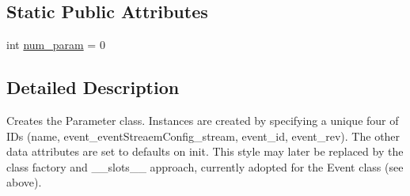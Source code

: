 \subsection*{Static Public Attributes}
\begin{DoxyCompactItemize}
\item 
int \hyperlink{classamonpy_1_1dbase_1_1db__classes_1_1_parameter_a505d26cebffda6dbddfb2366052606e2}{num\-\_\-param} = 0
\end{DoxyCompactItemize}


\subsection{Detailed Description}
\begin{DoxyVerb}Creates the Parameter class. Instances are created by specifying a unique 
    four of IDs (name, event_eventStreaemConfig_stream, event_id, event_rev). 
    The other data attributes are set to
    defaults on init. This style may later be replaced by the class
    factory and __slots__ approach, currently adopted for the Event
    class (see above). 
\end{DoxyVerb}
 

